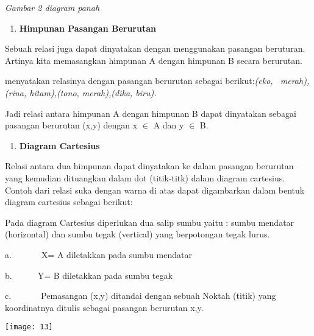 \documentclass[11pt,fleqn]{book} %
\begin{document}
\begin{myEnumerate}
\begin{itemize}
\noindent \textit{Gambar 2 diagram panah}

\noindent \textit{}

\begin{enumerate}
\item \textit{ }\textbf{Himpunan Pasangan Berurutan}
\end{enumerate}

\noindent 

\noindent Sebuah relasi juga dapat dinyatakan dengan menggunakan pasangan beruturan. Artinya kita memasangkan himpunan A dengan himpunan B secara berurutan.

\noindent 

\noindent 

\noindent 

\noindent 

\noindent 

\noindent 

\noindent 

\noindent menyatakan relasinya dengan pasangan berurutan sebagai berikut:\textit{(eko, ~merah), (rina, hitam),(tono, merah),(dika, biru).}

\noindent Jadi relasi antara himpunan A dengan himpunan B dapat dinyatakan sebagai pasangan berurutan (x,y) dengan x $\mathrm{\in }$ A dan y $\mathrm{\in }$ B.

\noindent 

\begin{enumerate}
\item  \textbf{Diagram Cartesius}
\end{enumerate}

\noindent Relasi antara dua himpunan dapat dinyatakan ke dalam pasangan berurutan yang kemudian dituangkan dalam dot (titik-titk) dalam diagram cartesius. Contoh dari relasi suka dengan warna di atas dapat digambarkan dalam bentuk diagram cartesius sebagai berikut:

\noindent Pada diagram Cartesius diperlukan dua salip sumbu yaitu : sumbu mendatar (horizontal) dan sumbu tegak (vertical) yang berpotongan tegak lurus.

\noindent a.~~~~~~~X= A diletakkan pada sumbu mendatar

\noindent b.~~~~~~Y= B diletakkan pada sumbu tegak

\noindent c.~~~~~~~Pemasangan (x,y) ditandai dengan sebuah Noktah (titik) yang koordinatnya ditulis sebagai pasangan berurutan x,y.

\begin{center}
\noindent \texttt{[image: 13]}
\end{center}


\end{itemize}
\end{myEnumerate}
\end{document}
